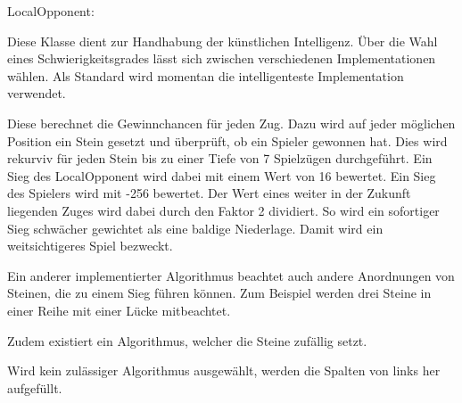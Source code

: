 LocalOpponent:

Diese Klasse dient zur Handhabung der künstlichen 
Intelligenz. Über die Wahl eines
Schwierigkeitsgrades lässt sich zwischen 
verschiedenen Implementationen wählen. Als Standard
wird momentan die intelligenteste Implementation 
verwendet.

Diese berechnet die Gewinnchancen für jeden Zug. 
Dazu wird auf jeder möglichen Position ein Stein
gesetzt und überprüft, ob ein Spieler gewonnen hat. 
Dies wird rekurviv für jeden Stein bis zu einer Tiefe 
von 7 Spielzügen durchgeführt. 
Ein Sieg des LocalOpponent wird dabei mit einem Wert 
von 16 bewertet. Ein Sieg des Spielers wird mit -256 
bewertet. 
Der Wert eines weiter in der Zukunft liegenden Zuges 
wird dabei durch den Faktor 2 dividiert. 
So wird ein sofortiger Sieg schwächer gewichtet als 
eine baldige Niederlage. Damit wird ein weitsichtigeres 
Spiel bezweckt. 

Ein anderer implementierter Algorithmus beachtet auch 
andere Anordnungen von Steinen, die zu einem Sieg 
führen können. Zum Beispiel werden drei Steine in 
einer Reihe mit einer Lücke mitbeachtet. 

Zudem existiert ein Algorithmus, welcher die Steine 
zufällig setzt. 

Wird kein zulässiger Algorithmus ausgewählt, werden 
die Spalten von links her aufgefüllt. 
